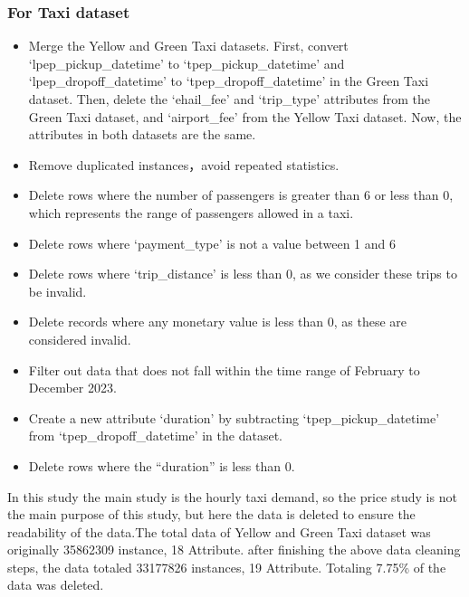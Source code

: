 \documentclass[11pt]{article}
\begin{document}
\subsubsection{For Taxi dataset}

\begin{itemize}
    \item Merge the Yellow and Green Taxi datasets. First, convert `lpep\_pickup\_datetime' to `tpep\_pickup\_datetime' and `lpep\_dropoff\_datetime' to `tpep\_dropoff\_datetime' in the Green Taxi dataset. Then, delete the `ehail\_fee' and `trip\_type' attributes from the Green Taxi dataset, and `airport\_fee' from the Yellow Taxi dataset. Now, the attributes in both datasets are the same.
    \item Remove duplicated instances，avoid repeated statistics.
    \item Delete rows where the number of passengers is greater than 6 or less than 0, which represents the range of passengers allowed in a taxi.
    \item Delete rows where `payment\_type' is not a value between 1 and 6
    \item Delete rows where `trip\_distance' is less than 0, as we consider these trips to be invalid.
    \item Delete records where any monetary value is less than 0, as these are considered invalid.
    \item Filter out data that does not fall within the time range of February to December 2023.
    \item Create a new attribute `duration' by subtracting `tpep\_pickup\_datetime' from `tpep\_dropoff\_datetime' in the dataset.
    \item Delete rows where the ``duration'' is less than 0.
\end{itemize}
In this study the main study is the hourly taxi demand, so the price study is not the main purpose of this study, but here the data is deleted to ensure the readability of the data.The total data of  Yellow and Green Taxi dataset was originally 35862309 instance, 18 Attribute. after finishing the above data cleaning steps, the data totaled 33177826 instances, 19 Attribute. Totaling 7.75\% of the data was deleted.
\end{document}
